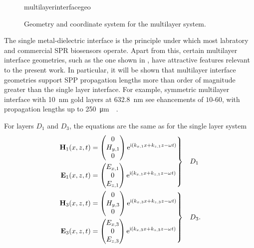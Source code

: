 \begin{figure}[ht]
\centering
{multilayerinterfacegeo}
\caption{Geometry and coordinate system for the multilayer system. }
\label{fig:multilayergeo}
\end{figure}

The single metal-dielectric interface is the principle under which most
labratory and commercial SPR biosensors operate.  Apart from this, certain
multilayer interface geometries, such as the one shown in
, have attractive features relevant to the
present work.  In particular, it will be shown that multilayer interface
geometries support SPP propagation lengths more than order of magnitude
greater than the single layer interface.  For example, symmetric multilayer
interface with \SI{10}{\nano\meter} gold layers at \SI{632.8}{\nano\meter}
see ehancements of $10$-$60$, with propagation lengths up to
\SI{250}{\micro\meter}~\cite{kuwamura1983experimental}~\cite{craig1983experimental}.

For layers $D_1$ and $D_3$, the equations are the same as for the single layer system
\begin{align}
\left.\begin{aligned}
\mathbf{H}_1(x,z,t) &=
\begin{pmatrix}
0\\
H_{y,1}\\
0
\end{pmatrix} {\mathrm{e}}^{{\mathrm{i}}(k_{x,1}x+k_{z,1}z-\omega t)}\\
\mathbf{E}_1(x,z,t) &=
\begin{pmatrix}
E_{x,1}\\
0\\
E_{z,1}\\
\end{pmatrix} {\mathrm{e}}^{{\mathrm{i}}(k_{x,1}x+k_{z,1}z-\omega t)}
\end{aligned}
\right\}& \quad D_1\label{eqn:lrsppplanewavedielectric}\\
\left.\begin{aligned}
\mathbf{H}_3(x,z,t) &=
\begin{pmatrix}
0\\
H_{y,3}\\
0
\end{pmatrix}
{\mathrm{e}}^{{\mathrm{i}}(k_{x,3}x+k_{z,3}z-\omega t)}\\
\mathbf{E}_3(x,z,t) &=
\begin{pmatrix}
E_{x,3}\\
0\\
E_{z,3}\\
\end{pmatrix}
{\mathrm{e}}^{{\mathrm{i}}(k_{x,3}x+k_{z,3}z-\omega t)}
\end{aligned} 
\right\}&\quad D_3.
\label{eqn:lrsppplanewavemetal}
\end{align}


